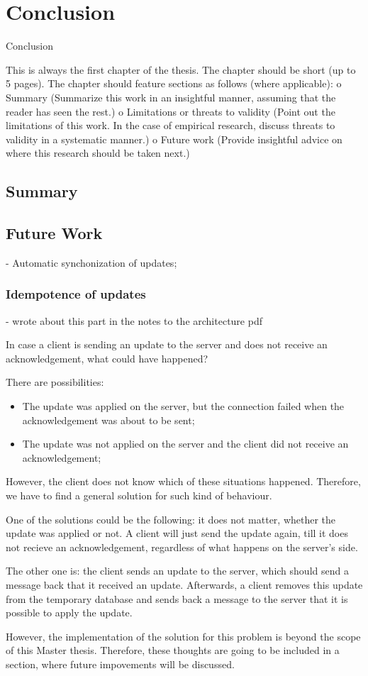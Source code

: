 \chapter{Conclusion}
\label{Conclusion}

Conclusion

This is always the first chapter of the thesis. The chapter should be short (up to 5 pages). The chapter should feature sections as follows (where applicable): o Summary (Summarize this work in an insightful manner, assuming that the reader has seen the rest.) o Limitations or threats to validity (Point out the limitations of this work. In the case of empirical research, discuss threats to validity in a systematic manner.) o Future work (Provide insightful advice on where this research should be taken next.)

\section{Summary}
\section{Future Work}

- Automatic synchonization of updates;

\subsection*{Idempotence of updates}

- wrote about this part in the notes to the architecture pdf

In case a client is sending an update to the server and does not receive an acknowledgement, what could have happened?

There are possibilities:
\begin{itemize}
    \item {The update was applied on the server, but the connection failed when the acknowledgement was about to be sent;}
    \item {The update was not applied on the server and the client did not receive an acknowledgement;}
\end{itemize}
However, the client does not know which of these situations happened. Therefore, we have to find a general solution for such kind of behaviour. 

One of the solutions could be the following: it does not matter, whether the update was applied or not. A client will just send the update again, till it does not recieve an acknowledgement, regardless of what happens on the server's side.

The other one is: the client sends an update to the server, which should send a message back that it received an update. Afterwards, a client removes this update from the temporary database and sends back a message to the server that it is possible to apply the update.

However, the implementation of the solution for this problem is beyond the scope of this Master thesis. Therefore, these thoughts are going to be included in a section, where future impovements will be discussed.